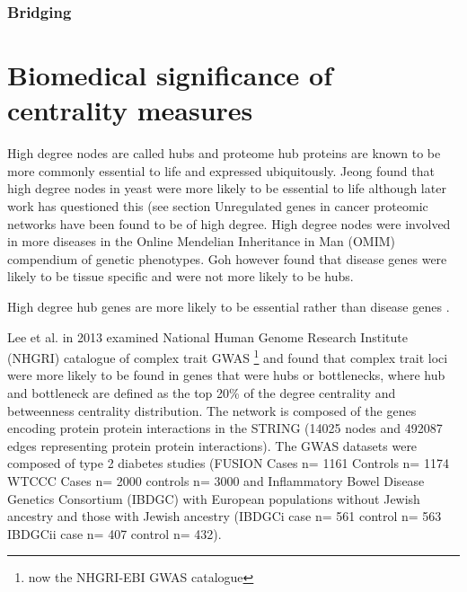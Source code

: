 \subsubsection{Bridging}

\cite{valente2010bridging}


\section{Biomedical significance of centrality measures}

 High degree nodes are called hubs and proteome hub proteins are known to be more commonly essential to life \cite{jeong2001lethality} and expressed ubiquitously. \cite{goh2007human}  Jeong found that high degree nodes in yeast were more likely to be essential to life \cite{jeong2001lethality} although later work has questioned this (see section Unregulated genes in cancer proteomic networks have been found to be of high degree. \cite{wachi2005interactome}  High degree nodes were  involved in more diseases in the Online Mendelian Inheritance in Man (OMIM) compendium of genetic phenotypes. \cite{xu2006discovering}  Goh however found that disease genes were likely to be tissue specific and were not more likely to be hubs. \cite{goh2007human}  
 
High degree hub genes are more likely to be essential rather than disease genes \cite{barabasi2011network}. 

Lee et al. \cite{lee2013network} in 2013 examined National Human Genome Research Institute (NHGRI)  catalogue of complex trait GWAS \footnote{now the NHGRI-EBI GWAS catalogue} and found that complex trait loci were more likely to be found in genes that were hubs or bottlenecks, where hub and bottleneck are defined as the top 20\% of the degree centrality and betweenness centrality distribution.  The network is composed of the genes encoding protein protein interactions in the STRING (14025 nodes and 492087 edges representing protein protein interactions). The GWAS datasets were composed of type 2 diabetes studies (FUSION  Cases n=	1161 Controls n=	1174 
WTCCC Cases n=	2000 controls n=	3000  and Inflammatory Bowel Disease Genetics Consortium (IBDGC) with European populations without Jewish ancestry and those with Jewish ancestry (IBDGCi case n=	561 control n=	563 IBDGCii case n= 	407 control n=	432).  

